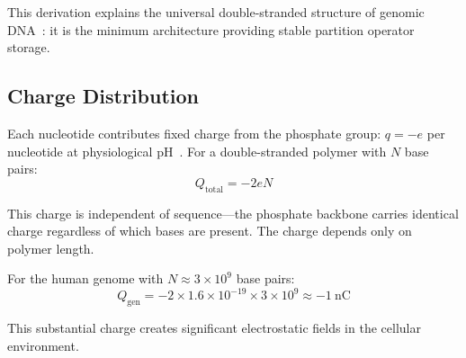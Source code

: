 \documentclass[twocolumn,aps,prb,superscriptaddress,longbibliography,floatfix]{revtex4-2}
\theoremstyle{remark}
\newcommand{\Qgen}{Q_\text{gen}}
\begin{document}
This derivation explains the universal double-stranded structure of
genomic DNA~\cite{Watson1953}: it is the minimum architecture providing
stable partition operator storage.

\subsection{Charge Distribution}

Each nucleotide contributes fixed charge from the phosphate group:
$q = -e$ per nucleotide at physiological pH~\cite{Manning1978}. For a
double-stranded polymer with $N$ base pairs:
\begin{equation}
Q_\text{total} = -2eN
\label{eq:dna_charge}
\end{equation}

This charge is independent of sequence---the phosphate backbone carries
identical charge regardless of which bases are present. The charge
depends only on polymer length.

For the human genome with $N \approx 3 \times 10^9$ base pairs:
\begin{equation}
\Qgen = -2 \times 1.6 \times 10^{-19} \times 3 \times 10^9 \approx -1~\text{nC}
\label{eq:genome_charge}
\end{equation}

This substantial charge creates significant electrostatic fields in the
cellular environment.
\end{document}
